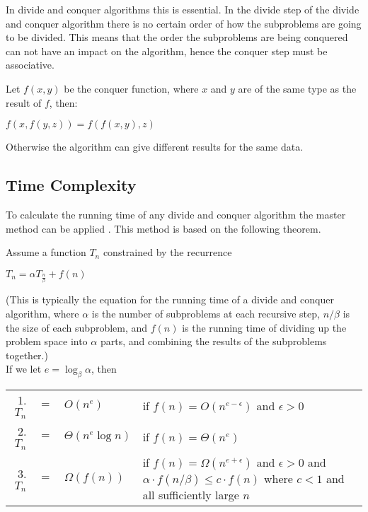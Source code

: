 In divide and conquer algorithms this is essential. In the divide step of the
divide and conquer algorithm there is no certain order of how the subproblems
are going to be divided. This means that the order the subproblems are being
conquered can not have an impact on the algorithm, hence the conquer step must be
associative.
\newline
\begin{example}\label{assprop}
Let $f(x,y)$ be the conquer function, where $x$ and $y$ are of the same type as
the result of $f$, then:
\begin{center}
$f(x,f(y,z)) = f(f(x,y),z)$
\end{center}
Otherwise the algorithm can give different results for the same data.
\end{example}

\subsection{Time Complexity}
To calculate the running time of any divide and conquer algorithm the master
method can be applied \cite{Cormen}. This method is based on the following
theorem.
\newline
\begin{theorem} $ $ \\
Assume a function $T_n$ constrained by the recurrence
\begin{center}
$T_n = {\alpha}T_{\frac{n}{\beta}}+ f(n)$
\end{center}
(This is typically the equation for the running time of a divide and conquer
algorithm, where $\alpha$ is the number of subproblems at each recursive step,
$n/\beta$ is the size of each subproblem, and $f(n)$ is the running time of
dividing up the problem space into $\alpha$ parts, and combining the results
of the subproblems together.)\\
If we let $e = \log_\beta \alpha$, then
\begin{center}
\begin{tabular}{r c l l}
1. $T_n$ & $=$ & $O(n^{e})$ &  if $f(n) = O(n^{e - \epsilon})$ and $\epsilon > 0$\\
2. $T_n$ & $=$ & $\Theta(n^{e} \log n)$ & if $f(n) = \Theta(n^e)$\\
3. $T_n$ & $=$ & $\Omega(f(n))$ & \begin{minipage}[t]{0.6 \columnwidth}
  if $f(n) = \Omega(n^{e+\epsilon})$ and $\epsilon > 0$
  and $\alpha \cdot f(n/\beta) \leq c \cdot f(n)$
  where $c < 1$ and all sufficiently large $n$
  \end{minipage}
\end{tabular}
\end{center}
\qeda
\end{theorem}

